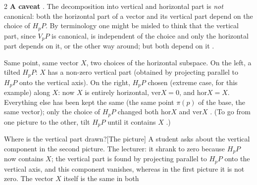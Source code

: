 \begin{paracol}{2}
\textbf{A caveat} . The decomposition into vertical and horizontal part is \emph{not} canonical: both the horizontal part of a vector and its vertical part depend on the choice of $H_pP$. By terminology one might be misled to think that the vertical part, since $V_pP$ is canonical, is independent of the choice and only the horizontal part depends on it, or the other way around; but both depend on it  .
\begin{center}
\end{center}
Same point, same vector $X$, two choices of the horizontal subspace. On the left, a tilted $H_pP$: $X$ has a non-zero vertical part (obtained by projecting parallel to $H_pP$ onto the vertical axis). On the right, $H_pP$ chosen (extreme case, for this example) along $X$: now $X$ is entirely horizontal, $\mathrm{ver}X=0$, and $\mathrm{hor}X=X$. Everything else has been kept the same (the same point $\pi(p)$ of the base, the same vector); only the choice of $H_pP$ changed both $\mathrm{hor}X$ and $\mathrm{ver}X$       . (To go from one picture to the other, tilt $H_pP$ until it contains $X$    .)
\begin{answer}{Where is the vertical part drawn?}[The picture]
A student asks about the vertical component in the second picture. The lecturer: it shrank to zero because $H_pP$ now contains $X$; the vertical part is found by projecting parallel to $H_pP$ onto the vertical axis, and this component vanishes, whereas in the first picture it is not zero. The vector $X$ itself is the same in both   
\end{answer}


\end{paracol}
